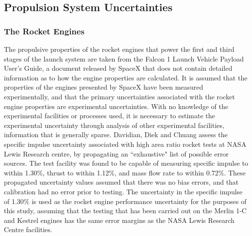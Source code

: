 



\subsection{Propulsion System Uncertainties}\label{sec:propunc}




\subsubsection{The Rocket Engines}
The propulsive properties of the rocket engines that power the first and third stages of the launch system are taken from the Falcon 1 Launch Vehicle Payload User's Guide\cite{Vehicle2008}, a document released by SpaceX that does not contain detailed information as to how the engine properties are calculated. It is assumed that the properties of the engines presented by SpaceX have been measured experimentally, and that the primary uncertainties associated with the rocket engine properties are experimental uncertainties. With no knowledge of the experimental facilities or processes used, it is necessary to estimate the experimental uncertainty through analysis of other experimental facilities, information that is generally sparse. Davidian, Diek and Chuang\cite{Davidian1987} assess the specific impulse uncertainty associated with high area ratio rocket tests at NASA Lewis Research centre, by propagating an ``exhaustive" list of possible error sources. The test facility was found to be capable of measuring specific impulse to within 1.30\%, thrust to within 1.12\%, and mass flow rate to within 0.72\%. These propagated uncertainty values assumed that there was no bias errors, and that calibration had no error prior to testing. 
The uncertainty in the specific impulse of 1.30\% is used as the rocket engine performance uncertainty for the purposes of this study, assuming that the testing that has been carried out on the Merlin 1-C and Kestrel engines has the same error margins as the NASA Lewis Research Centre facilities. 

